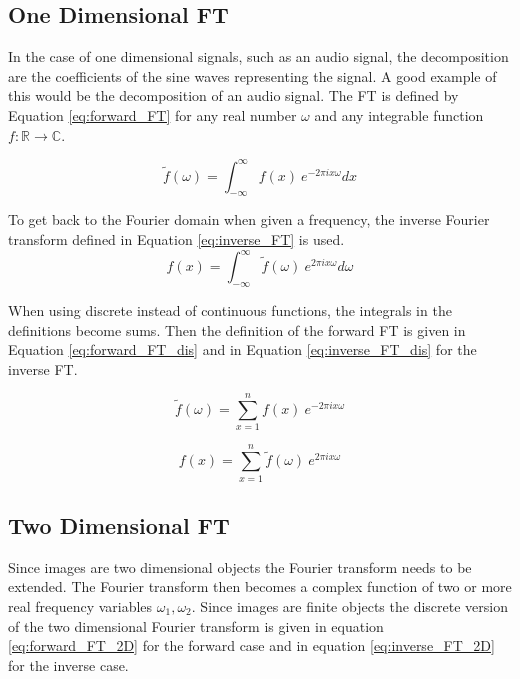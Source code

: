 \subsection{One Dimensional FT} 

In the case of one dimensional signals, such as an audio signal, the decomposition are the coefficients of the sine waves representing the signal. A good example of this would be the decomposition of an audio signal. The FT is defined by Equation \ref{eq:forward_FT} for any real number $\omega$ and any integrable function $f:\mathbb{R} \rightarrow \mathbb{C}$. 

\begin{equation}
	\tilde{f}(\omega) = \int_{-\infty}^{\infty} f(x)\ e^{-2\pi i x \omega}dx
	\label{eq:forward_FT}
\end{equation} 

To get back to the Fourier domain when given a frequency, the inverse Fourier transform defined in Equation \ref{eq:inverse_FT} is used.  \\

\begin{equation}
	f(x) = \int_{-\infty}^{\infty} \tilde{f}(\omega)\ e^{2 \pi i x \omega}d\omega
	\label{eq:inverse_FT}
\end{equation}

When using discrete instead of continuous functions, the integrals in the definitions become sums. Then the definition of the forward FT is given in Equation \ref{eq:forward_FT_dis} and in Equation \ref{eq:inverse_FT_dis} for the inverse FT. 

\begin{equation}
\tilde{f}(\omega) = \sum_{x=1}^{n} f(x)\ e^{-2\pi i x \omega}
\label{eq:forward_FT_dis}
\end{equation} 

\begin{equation}
f(x) = \sum_{x=1}^{n} \tilde{f}(\omega)\ e^{2 \pi i x \omega}
\label{eq:inverse_FT_dis}
\end{equation}

\subsection{Two Dimensional FT}

Since images are two dimensional objects the Fourier transform needs to be extended. The Fourier transform then becomes a complex function of two or more real frequency variables $\omega_1, \omega_2$. Since images are finite objects the discrete version of the two dimensional Fourier transform is given in equation \ref{eq:forward_FT_2D} for the forward case and in equation \ref{eq:inverse_FT_2D} for the inverse case.

